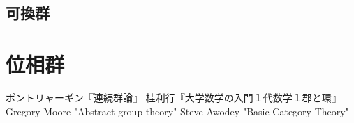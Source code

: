 \documentclass[uplatex,dvipdfmx]{jsreport}
\begin{document}
\section{可換群}

\chapter{位相群}

\begin{thebibliography}{9}
        ポントリャーギン『連続群論』
        桂利行『大学数学の入門１代数学１郡と環』
        Gregory Moore "Abstract group theory"
        Steve Awodey "Basic Category Theory"
\end{thebibliography}
\end{document}
